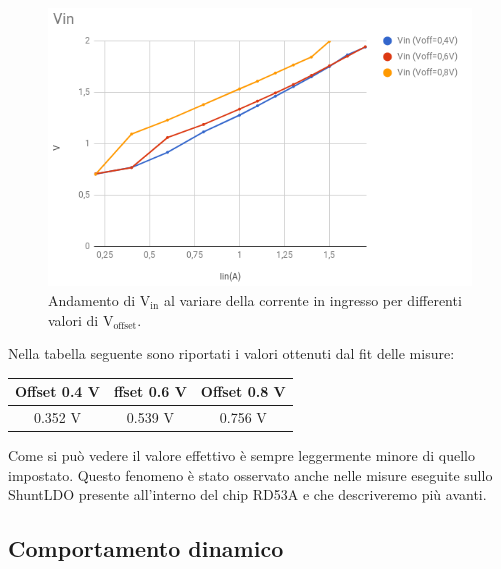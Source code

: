 \begin{figure}
\centering
\includegraphics[scale=.4]{Immagini/VinVsVoffset}
\caption{Andamento di $\mathrm{V_{in}}$ al variare della corrente in ingresso per differenti valori di $\mathrm{V_{offset}}$.}
\label{VinVsVoffset}
\end{figure}

Nella tabella seguente sono riportati i valori ottenuti dal fit delle misure:

\begin{center}
\begin{tabular}{ccc}
\hline
Offset 0.4 V & ffset 0.6 V & Offset 0.8 V\\
\hline
0.352 V & 0.539 V & 0.756 V\\
\hline
\end{tabular}
\end{center}
%
%
%
%

Come si può vedere il valore effettivo è sempre leggermente minore di quello impostato. Questo fenomeno è stato osservato anche nelle misure eseguite sullo ShuntLDO presente all'interno del chip RD53A e che descriveremo più avanti.
\FloatBarrier

\subsection{Comportamento dinamico}

